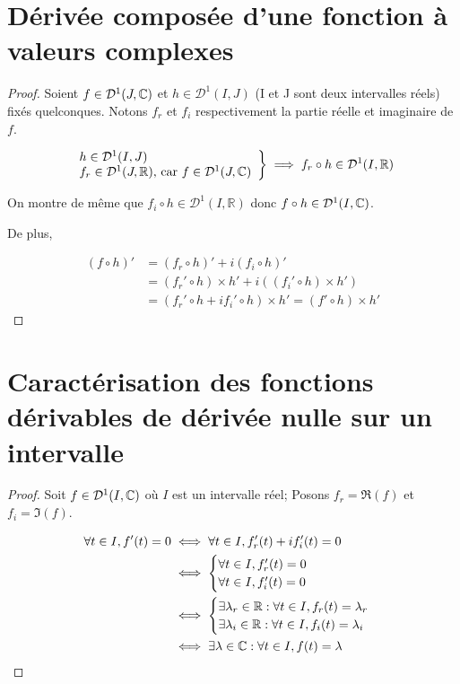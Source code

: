 \documentclass{article}
\begin{document}
\section{Dérivée composée d'une fonction à valeurs complexes}
\begin{proof}
Soient $f \in \mathcal D ^1(J, \mathbb C) $ et $h \in \mathcal D^1(I, J)$ (I et J sont deux intervalles réels) fixés quelconques. Notons $f_r$ et $f_i$ respectivement la partie réelle et imaginaire de $f$.

\begin{align*}
	\left .
	\begin{array}{ll}
		h \in \mathcal D^1(I, J) \\
		f_r \in \mathcal D^1(J, \mathbb R) \text{, car } f \in \mathcal D^1(J, \mathbb C)
	\end{array}
	\right \}
	\implies f_r \circ h \in \mathcal D^1(I, \mathbb R)
\end{align*}

On montre de même que $f_i \circ h \in \mathcal D^1(I, \mathbb  R)$ donc $f \circ h \in \mathcal D^1(I, \mathbb C)$.

De plus,

\begin{align*}
	(f \circ h)' &= (f_r \circ h)' + i (f_i \circ h)' \\
	&= (f_r' \circ h ) \times h' + i((f_i' \circ h) \times h')\\
	&=(f_r' \circ h + if_i' \circ h) \times h' = (f' \circ h) \times h'
\end{align*}
\end{proof}
\section{Caractérisation des fonctions dérivables de dérivée nulle sur un intervalle}
\begin{proof}
Soit $f \in \mathcal D ^1 (I, \mathbb C)$ où $I$ est un intervalle réel;
Posons $f_r = \Re (f)$ et $f_i = \Im(f)$.

\begin{align*}
\forall t \in I, f'(t) = 0 &\iff \forall t \in I, f_r'(t) + i f_i'(t) = 0 \\
&\iff \begin{cases}
	\forall t \in I, f_r'(t) = 0 \\
	\forall t \in I, f_i'(t) = 0
\end{cases} \\
&\iff \begin{cases}
	\exists \lambda_r \in \mathbb R : \forall t \in I,  f_r(t) = \lambda_r \\
		\exists \lambda_i \in \mathbb R : \forall t \in I,  f_i(t) = \lambda_i
\end{cases} \\
&\iff \exists \lambda \in \mathbb C : \forall t \in I,  f(t) = \lambda
\end{align*}
\end{proof}
\end{document}
